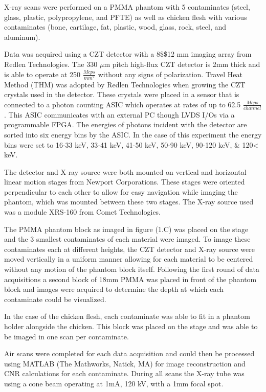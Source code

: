 \documentclass[11pt]{article}
\begin{document}
    X-ray scans were performed on a PMMA phantom with 5 contaminates (steel,
glass, plastic, polypropylene, and PFTE) as well as chicken flesh with
various contaminates (bone, cartilage, fat, plastic, wood, glass, rock,
steel, and aluminum).

Data was acquired using a CZT detector with a 8\$\times\$12 mm imaging
array from Redlen Technologies. The 330 \(\mu\)m pitch high-flux CZT
detector is 2mm thick and is able to operate at 250
\(\frac{Mcps}{mm^2}\) without any signs of polarization. Travel Heat
Method (THM) was adopted by Redlen Technologies when growing the CZT
crystals used in the detector. These crystals were placed in a sensor
that is connected to a photon counting ASIC which operates at rates of
up to 62.5 \(\frac{Mcps}{channel}\). This ASIC communicates with an
external PC though LVDS I/Os via a programmable FPGA. The energies of
photons incident with the detector are sorted into six energy bins by
the ASIC. In the case of this experiment the energy bins were set to
16-33 keV, 33-41 keV, 41-50 keV, 50-90 keV, 90-120 keV, \&
120\textless{} keV.

The detector and X-ray source were both mounted on vertical and
horizontal linear motion stages from Newport Corporations. These stages
were oriented perpendicular to each other to allow for easy navigation
while imaging the phantom, which was mounted between these two stages.
The X-ray source used was a module XRS-160 from Comet Technologies.

The PMMA phantom block as imaged in figure (1.C) was placed on the stage
and the 3 smallest contaminates of each material were imaged. To image
these contaminates each at different heights, the CZT detector and X-ray
source were moved vertically in a uniform manner allowing for each
material to be centered without any motion of the phantom block itself.
Following the first round of data acquisitions a second block of 18mm
PMMA was placed in front of the phantom block and images were acquired
to determine the depth at which each contaminate could be visualized.

In the case of the chicken flesh, each contaminate was able to fit in a
phantom holder alongside the chicken. This block was placed on the stage
and was able to be imaged in one scan per contaminate.

Air scans were completed for each data acquisition and could then be
processed using MATLAB (The Mathworks, Natick, MA) for image
reconstruction and CNR calculations for each contaminate. During all
scans the X-ray tube was using a cone beam operating at 1mA, 120 kV,
with a 1mm focal spot.
\end{document}
